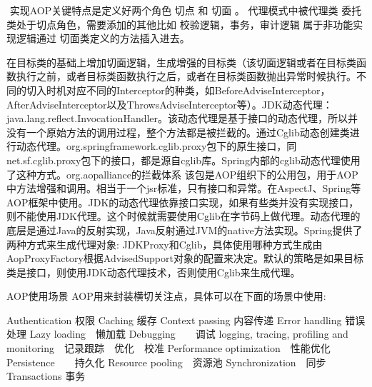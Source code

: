 \documentclass[../../../interview-questions.tex]{subfiles}
\begin{document}
​ 实现AOP关键特点是定义好两个角色 切点 和 切面 。 代理模式中被代理类 委托类处于切点角色，需要添加的其他比如 校验逻辑，事务，审计逻辑 属于非功能实现逻辑通过 切面类定义的方法插入进去。

在目标类的基础上增加切面逻辑，生成增强的目标类（该切面逻辑或者在目标类函数执行之前，或者目标类函数执行之后，或者在目标类函数抛出异常时候执行。不同的切入时机对应不同的Interceptor的种类，如BeforeAdviseInterceptor，AfterAdviseInterceptor以及ThrowsAdviseInterceptor等）。JDK动态代理：java.lang.reflect.InvocationHandler。该动态代理是基于接口的动态代理，所以并没有一个原始方法的调用过程，整个方法都是被拦截的。通过Cglib动态创建类进行动态代理。org.springframework.cglib.proxy包下的原生接口，同net.sf.cglib.proxy包下的接口，都是源自cglib库。Spring内部的cglib动态代理使用了这种方式。org.aopalliance的拦截体系
该包是AOP组织下的公用包，用于AOP中方法增强和调用。相当于一个jsr标准，只有接口和异常。在AspectJ、Spring等AOP框架中使用。JDK的动态代理依靠接口实现，如果有些类并没有实现接口，则不能使用JDK代理。这个时候就需要使用Cglib在字节码上做代理。动态代理的底层是通过Java的反射实现，Java反射通过JVM的native方法实现。Spring提供了两种方式来生成代理对象: JDKProxy和Cglib，具体使用哪种方式生成由AopProxyFactory根据AdvisedSupport对象的配置来决定。默认的策略是如果目标类是接口，则使用JDK动态代理技术，否则使用Cglib来生成代理。


AOP使用场景
AOP用来封装横切关注点，具体可以在下面的场景中使用:

Authentication 权限
Caching 缓存
Context passing 内容传递
Error handling 错误处理
Lazy loading　懒加载
Debugging　　调试
logging, tracing, profiling and monitoring　记录跟踪　优化　校准
Performance optimization　性能优化
Persistence　　持久化
Resource pooling　资源池
Synchronization　同步
Transactions 事务
\end{document}
